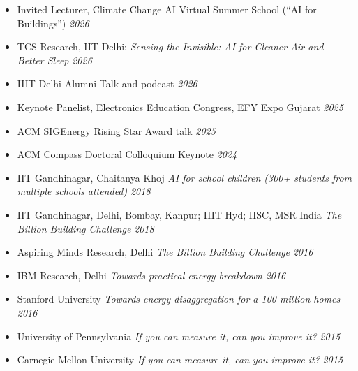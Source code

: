 \documentclass[letter,10pt]{article}
\begin{document}
\begin{itemize}
      \item[] {Invited Lecturer, Climate Change AI Virtual Summer School (``AI for Buildings'')} \hfill \textit{2026}
      \item[] {TCS Research, IIT Delhi: \textit{Sensing the Invisible: AI for Cleaner Air and Better Sleep}} \hfill \textit{2026}
      \item[] {IIIT Delhi Alumni Talk and podcast} \hfill \textit{2026}
      \item[] {Keynote Panelist, Electronics Education Congress, EFY Expo Gujarat} \hfill \textit{2025}
      \item[] {ACM SIGEnergy Rising Star Award talk} \hfill \textit{2025}
      \item[] {ACM Compass Doctoral Colloquium Keynote} \hfill \textit{2024}
      \item[] {IIT Gandhinagar, Chaitanya Khoj}
	 \textit{AI for school children (300+ students from multiple schools attended)} \hfill \textit{2018}
      \item[] {IIT Gandhinagar, Delhi, Bombay, Kanpur; IIIT Hyd; IISC, MSR India}
	 \textit{The Billion Building Challenge} \hfill \textit{2018}
     \item[] {Aspiring Minds Research, Delhi}
	 \textit{The Billion Building Challenge} \hfill \textit{2016}
    \item[] {IBM Research, Delhi}
	 \textit{Towards practical energy breakdown} \hfill \textit{2016}
	
	\item[] {Stanford University}
	\textit{Towards energy disaggregation for a 100 million homes} \hfill \textit{2016}
	\item[] {University of Pennsylvania}
	\textit{If you can measure it, can you improve it?} \hfill \textit{2015}
	\item[] {Carnegie Mellon University}
	\textit{If you can measure it, can you improve it?} \hfill \textit{2015}
	
\end{itemize}



\end{document}
